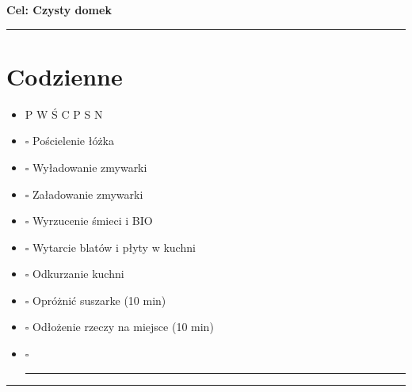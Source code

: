 \documentclass[a4paper, 12pt]{article} %
\newcommand{\dailyboxes}{%
    \leavevmode\unskip\nobreak%
    {\Large$\square$}%
    \hspace{1mm}{\Large$\square$}%
    \hspace{1mm}{\Large$\square$}%
    \hspace{1mm}{\Large$\square$}%
    \hspace{1mm}{\Large$\square$}%
    \hspace{1mm}{\Large$\square$}%
    \hspace{1mm}{\Large$\square$}%
    \hspace{1ex}
}
\newcommand{\dailyboxesDayNames}{%
    \leavevmode\unskip\nobreak%
    P
    \hspace{1.5mm}W
    \hspace{1.5mm}Ś
    \hspace{1.5mm}C
    \hspace{1.5mm}P
    \hspace{1.5mm}S
    \hspace{1.5mm}N
    \hspace{1ex}
}
\begin{document}
\begin{center}
    {\Huge\bfseries Cel: Czysty domek}
    \vspace{1em} %
\end{center}

\hrule
\section*{Codzienne}
\begin{itemize}
    \item \dailyboxesDayNames
    \item \dailyboxes Pościelenie łóżka
    \item \dailyboxes Wyładowanie zmywarki
    \item \dailyboxes Załadowanie zmywarki
    \item \dailyboxes Wyrzucenie śmieci i BIO
    \item \dailyboxes Wytarcie blatów i płyty w kuchni 
    \item \dailyboxes Odkurzanie kuchni
    \item \dailyboxes Opróżnić suszarke (10 min)
    \item \dailyboxes Odłożenie rzeczy na miejsce (10 min)
    \item \dailyboxes \rule[0pt]{10cm}{0.5pt}
\end{itemize}
\hrule

\vspace{1em} %

\end{document}
